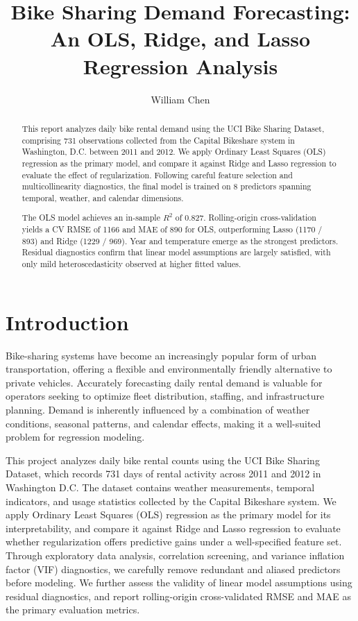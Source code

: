 \documentclass[12pt, a4paper]{article}
\title{
    \vspace{-1cm}
    \Large\textbf{Bike Sharing Demand Forecasting:\\[0.3em]
    An OLS, Ridge, and Lasso Regression Analysis}
}
\author{
    William Chen
}
\date{}
\begin{document}
\maketitle
\thispagestyle{empty}

\begin{abstract}
This report analyzes daily bike rental demand using the UCI Bike Sharing
Dataset, comprising 731 observations collected from the Capital Bikeshare
system in Washington, D.C. between 2011 and 2012. We apply Ordinary Least
Squares (OLS) regression as the primary model, and compare it against
Ridge and Lasso regression to evaluate the effect of regularization.
Following careful feature selection and multicollinearity diagnostics, the
final model is trained on 8 predictors spanning temporal, weather, and
calendar dimensions.

The OLS model achieves an in-sample $R^2$ of 0.827. Rolling-origin
cross-validation yields a CV RMSE of 1166 and MAE of 890 for OLS,
outperforming Lasso (1170 / 893) and Ridge (1229 / 969). Year and
temperature emerge as the strongest predictors. Residual diagnostics
confirm that linear model assumptions are largely satisfied, with only
mild heteroscedasticity observed at higher fitted values.

\end{abstract}
\newpage

\section{Introduction}

Bike-sharing systems have become an increasingly popular form of urban
transportation, offering a flexible and environmentally friendly alternative
to private vehicles. Accurately forecasting daily rental demand is valuable
for operators seeking to optimize fleet distribution, staffing, and
infrastructure planning. Demand is inherently influenced by a combination
of weather conditions, seasonal patterns, and calendar effects, making it a
well-suited problem for regression modeling.

This project analyzes daily bike rental counts using the UCI Bike Sharing
Dataset, which records 731 days of rental activity across 2011 and 2012 in
Washington D.C. The dataset contains weather measurements, temporal
indicators, and usage statistics collected by the Capital Bikeshare system.
We apply Ordinary Least Squares (OLS) regression as the primary model for
its interpretability, and compare it against Ridge and Lasso regression to
evaluate whether regularization offers predictive gains under a
well-specified feature set. Through exploratory data analysis, correlation
screening, and variance inflation factor (VIF) diagnostics, we carefully
remove redundant and aliased predictors before modeling. We further assess
the validity of linear model assumptions using residual diagnostics, and
report rolling-origin cross-validated RMSE and MAE as the primary
evaluation metrics.
\end{document}

